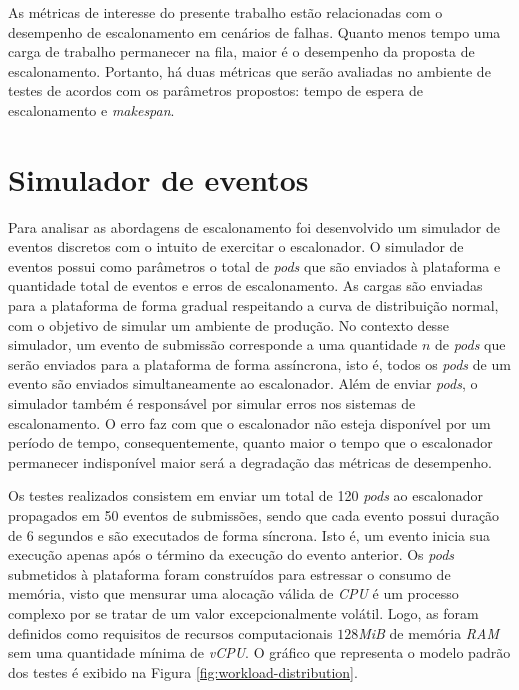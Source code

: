 As métricas de interesse do presente trabalho estão relacionadas com o desempenho de escalonamento em cenários de falhas. Quanto menos tempo uma carga de trabalho permanecer na fila, maior é o desempenho da proposta de escalonamento. Portanto, há duas métricas que serão avaliadas no ambiente de testes de acordos com os parâmetros propostos: tempo de espera de escalonamento e \textit{makespan}.

\section{Simulador de eventos \label{sec-simulador-de-eventos}}
Para analisar as abordagens de escalonamento foi desenvolvido um simulador de eventos discretos com o intuito de exercitar o escalonador. O simulador de eventos possui como parâmetros o total de \textit{pods} que são enviados à plataforma e quantidade total de eventos e erros de escalonamento. As cargas são enviadas para a plataforma de forma gradual respeitando a curva de distribuição normal, com o objetivo de simular um ambiente de produção. No contexto desse simulador, um evento de submissão corresponde a uma quantidade $n$ de \textit{pods} que serão enviados para a plataforma de forma assíncrona, isto é, todos os \textit{pods} de um evento são enviados simultaneamente ao escalonador. Além de enviar \textit{pods}, o simulador também é responsável por simular erros nos sistemas de escalonamento. O erro faz com que o escalonador não esteja disponível por um período de tempo, consequentemente, quanto maior o tempo que o escalonador permanecer indisponível maior será a degradação das métricas de desempenho. 


Os testes realizados consistem em enviar um total de 120 \textit{pods} ao escalonador propagados em 50 eventos de submissões, sendo que cada evento possui duração de 6 segundos e são executados de forma síncrona. Isto é, um evento inicia sua execução apenas após o término da execução do evento anterior. Os \textit{pods} submetidos à plataforma foram construídos para estressar o consumo de memória, visto que mensurar uma alocação válida de \textit{CPU} é um processo complexo por se tratar de um valor excepcionalmente volátil. Logo, as foram definidos como requisitos de recursos computacionais $128$\textit{MiB} de memória \textit{RAM} sem uma  quantidade mínima de \textit{vCPU}. O gráfico que representa o modelo padrão dos testes é exibido na Figura \ref{fig:workload-distribution}.

